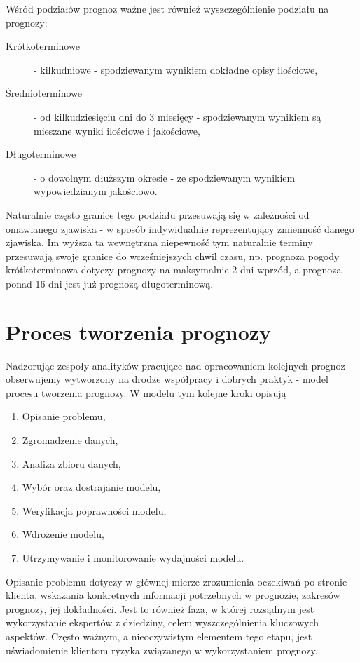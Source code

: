 \documentclass[10pt,a4paper]{book}
\begin{document}
Wśród podziałów prognoz ważne jest również wyszczególnienie podziału na prognozy:
\begin{description}
\item[Krótkoterminowe] - kilkudniowe - spodziewanym wynikiem dokładne opisy ilościowe,
\item[Średnioterminowe] - od kilkudziesięciu dni do 3 miesięcy - spodziewanym wynikiem są mieszane wyniki ilościowe i jakościowe, 
\item[Długoterminowe] - o dowolnym dłuższym okresie - ze spodziewanym wynikiem wypowiedzianym jakościowo. 
\end{description}
Naturalnie często granice tego podziału przesuwają się w zależności od omawianego zjawiska - w sposób indywidualnie reprezentujący zmienność danego zjawiska. Im wyższa ta wewnętrzna niepewność tym naturalnie terminy przesuwają swoje granice do wcześniejszych chwil czasu, np. prognoza pogody krótkoterminowa dotyczy prognozy na maksymalnie 2 dni wprzód, a prognoza ponad 16 dni jest już prognozą długoterminową.

\section{Proces tworzenia prognozy}

Nadzorując zespoły analityków pracujące nad opracowaniem kolejnych prognoz obserwujemy wytworzony na drodze współpracy i dobrych praktyk - model procesu tworzenia prognozy. W modelu tym kolejne kroki opisują \citep[Sec. 1.3]{montgomery2015introduction}

\begin{enumerate}
\item Opisanie problemu,
\item Zgromadzenie danych,
\item Analiza zbioru danych,
\item Wybór oraz dostrajanie modelu,
\item Weryfikacja poprawności modelu,
\item Wdrożenie modelu,
\item Utrzymywanie i monitorowanie wydajności modelu.
\end{enumerate}

Opisanie problemu dotyczy w głównej mierze zrozumienia oczekiwań po stronie klienta, wskazania konkretnych informacji potrzebnych w prognozie, zakresów prognozy, jej dokładności. Jest to również faza, w której rozsądnym jest wykorzystanie ekspertów z dziedziny, celem wyszczególnienia kluczowych aspektów. Często ważnym, a nieoczywistym elementem tego etapu, jest uświadomienie klientom ryzyka związanego w wykorzystaniem prognozy.
\end{document}
